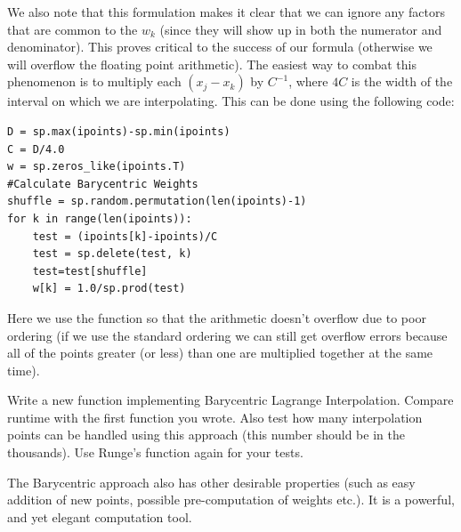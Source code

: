 We also note that this formulation makes it clear that we can ignore any factors that are common to the $w_k$ (since they will show up in both the numerator and denominator). This proves critical to the success of our formula (otherwise we will overflow the floating point arithmetic). The easiest way to combat this phenomenon is to multiply each $(x_j-x_k)$ by $C^{-1}$, where $4C$ is the width of the interval on which we are interpolating. This can be done using the following code:

\begin{lstlisting}
D = sp.max(ipoints)-sp.min(ipoints)
C = D/4.0
w = sp.zeros_like(ipoints.T)
#Calculate Barycentric Weights
shuffle = sp.random.permutation(len(ipoints)-1)
for k in range(len(ipoints)):
    test = (ipoints[k]-ipoints)/C
    test = sp.delete(test, k)
    test=test[shuffle]
    w[k] = 1.0/sp.prod(test)
\end{lstlisting}

Here we use the  function so that the arithmetic doesn't overflow due to poor ordering (if we use the standard ordering we can still get overflow errors because all of the points greater (or less) than one are multiplied together at the same time).

\begin{problem}
Write a new function implementing Barycentric Lagrange Interpolation. Compare runtime with the first function you wrote. Also test how many interpolation points can be handled using this approach (this number should be in the thousands). Use Runge's function again for your tests.
\end{problem}

The Barycentric approach also has other desirable properties (such as easy addition of new points, possible pre-computation of weights etc.). It is a powerful, and yet elegant computation tool.
